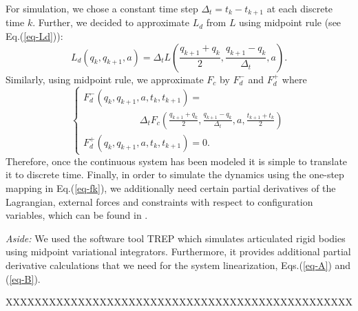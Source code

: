 \documentclass[letterpaper, 10pt, conference]{ieeeconf}
\begin{document}
For simulation, we chose a constant time step $\Delta_t = t_k - t_{k+1}$ at each discrete time $k$.  Further, we decided to approximate $L_d$ from $L$ using midpoint rule (see Eq.(\ref{eq-Ld})):
\begin{equation}
L_d(q_k,q_{k+1},a) = \Delta_t L(\frac{q_{k+1}+q_k}{2},\frac{q_{k+1}-q_k}{\Delta_t},a).
\label{eq-Ld}
\end{equation}
Similarly, using midpoint rule, we approximate $F_c$ by $F_d^-$ and $F_d^+$ where
\begin{equation}
\left\{
\begin{array}{l}
F_d^-(q_k,q_{k+1},a,t_k,t_{k+1}) = \\\hspace{70pt}\Delta_t F_c(\frac{q_{k+1}+q_k}{2},\frac{q_{k+1}-q_k}{\Delta_t},a,\frac{t_{k+1}+t_k}{2})\\
F_d^+(q_k,q_{k+1},a,t_k,t_{k+1}) = 0.
\end{array}
\right.
\label{eq-Fd}
\end{equation}
Therefore, once the continuous system has been modeled it is simple to translate it to discrete time.  Finally, in order to simulate the dynamics using the one-step mapping in Eq.(\ref{eq-fk}), we additionally need certain partial derivatives of the Lagrangian, external forces and constraints with respect to configuration variables, which can be found in \cite{johnson_murphey_scalable}.  

\emph{Aside:}  We used the software tool TREP \cite{johnson_murphey_scalable} which simulates articulated rigid bodies using midpoint variational integrators.  Furthermore, it provides additional partial derivative calculations that we need for the system linearization, Eqs.(\ref{eq-A}) and (\ref{eq-B}).  




XXXXXXXXXXXXXXXXXXXXXXXXXXXXXXXXXXXXXXXXXXXXXXXX

%
\end{document}
